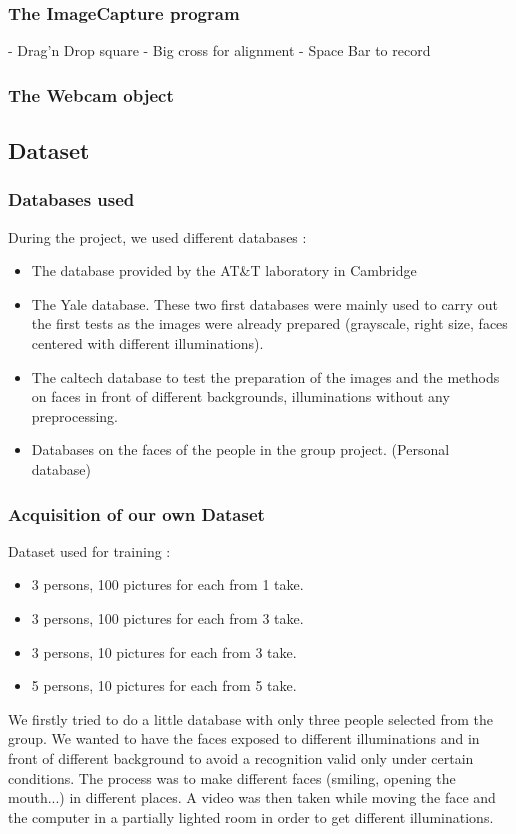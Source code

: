 \subsubsection{The ImageCapture program}
- Drag'n Drop square
- Big cross for alignment
- Space Bar to record

\subsubsection{The Webcam object}



\subsection{Dataset}

\subsubsection{Databases used}
During the project, we used different databases :
\begin{itemize}
 \item The database provided by the AT\&T laboratory in Cambridge
\item The Yale database. These two first databases were mainly used to carry out the first tests as the images were already prepared (grayscale, right size, faces centered with different illuminations).
\item The caltech database to test the preparation of the images and the methods on faces in front of different backgrounds, illuminations without any preprocessing.
\item Databases on the faces of the people in the group project. (Personal database)
\end{itemize}
\subsubsection{Acquisition of our own Dataset}
Dataset used for training :
\begin{itemize}
 \item 3 persons, 100 pictures for each from 1 take.  
\item 3 persons, 100 pictures for each from 3 take.
\item 3 persons, 10 pictures for each from 3 take.
\item 5 persons, 10 pictures for each from 5 take.
\end{itemize}
We firstly tried to do a little database with only three people selected from the group. We wanted to have the faces exposed to different illuminations and in front of different background to avoid a recognition valid only under certain conditions. The process was to make different faces (smiling, opening the mouth...) in different places. A video was then taken while moving the face and the computer in a partially lighted room in order to get different illuminations. 

